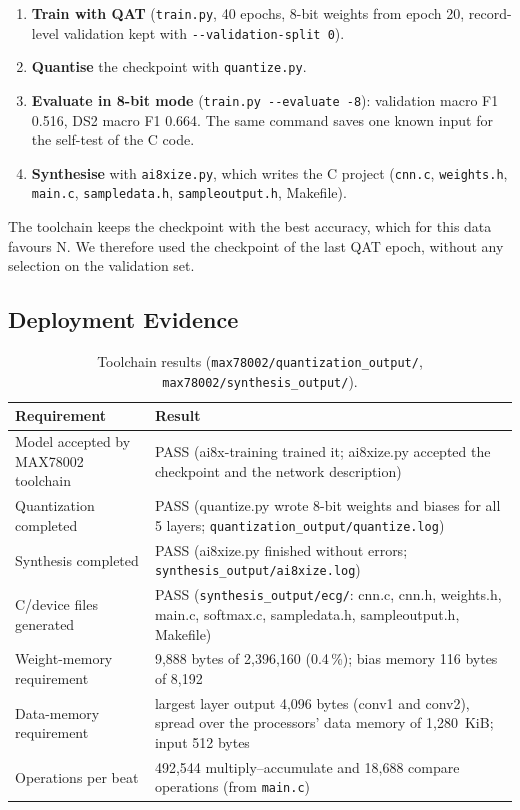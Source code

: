 \documentclass[11pt,a4paper]{article}
\newcommand{\code}[1]{\texttt{#1}}
\begin{document}
\begin{enumerate}
  \item \textbf{Train with QAT} (\code{train.py}, 40 epochs, 8-bit weights from epoch 20, record-level validation kept with \code{-{}-validation-split 0}).
  \item \textbf{Quantise} the checkpoint with \code{quantize.py}.
  \item \textbf{Evaluate in 8-bit mode} (\code{train.py -{}-evaluate -8}): validation macro F1 0.516, DS2 macro F1 0.664. The same command saves one known input for the self-test of the C code.
  \item \textbf{Synthesise} with \code{ai8xize.py}, which writes the C project (\code{cnn.c}, \code{weights.h}, \code{main.c}, \code{sampledata.h}, \code{sampleoutput.h}, Makefile).
\end{enumerate}

The toolchain keeps the checkpoint with the best accuracy, which for this data favours N. We therefore used the checkpoint of the last QAT epoch, without any selection on the validation set.

\subsection{Deployment Evidence}

\begin{table}[H]
\centering
\small
\caption{Toolchain results (\code{max78002/quantization\_output/}, \code{max78002/synthesis\_output/}).}
\label{tab:deploy}
\begin{tabularx}{\textwidth}{@{} >{\raggedright\arraybackslash}p{3.6cm} L @{}}
\toprule
Requirement & Result \\
\midrule
Model accepted by MAX78002 toolchain & PASS (ai8x-training trained it; ai8xize.py accepted the checkpoint and the network description) \\
Quantization completed & PASS (quantize.py wrote 8-bit weights and biases for all 5 layers; \code{quantization\_output/quantize.log}) \\
Synthesis completed & PASS (ai8xize.py finished without errors; \code{synthesis\_output/ai8xize.log}) \\
C/device files generated & PASS (\code{synthesis\_output/ecg/}: cnn.c, cnn.h, weights.h, main.c, softmax.c, sampledata.h, sampleoutput.h, Makefile) \\
Weight-memory requirement & 9,888 bytes of 2,396,160 (0.4\,\%); bias memory 116 bytes of 8,192 \\
Data-memory requirement & largest layer output 4,096 bytes (conv1 and conv2), spread over the processors' data memory of 1,280~KiB; input 512 bytes \\
Operations per beat & 492,544 multiply--accumulate and 18,688 compare operations (from \code{main.c}) \\
\bottomrule
\end{tabularx}
\end{table}
\end{document}
